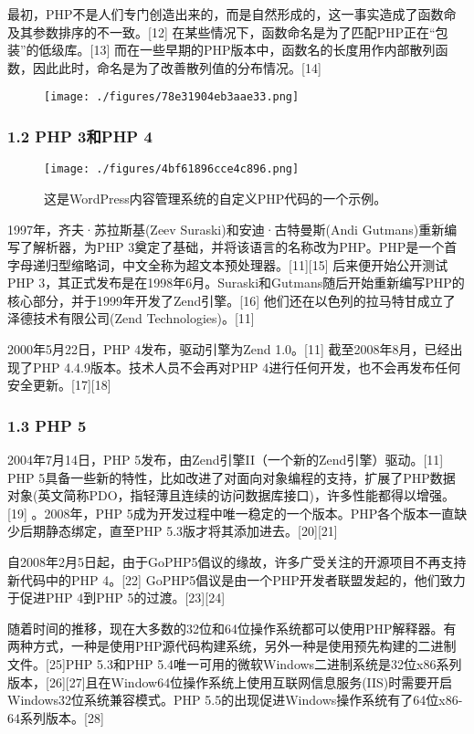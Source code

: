 最初，PHP不是人们专门创造出来的，而是自然形成的，这一事实造成了函数命及其参数排序的不一致。[12] 在某些情况下，函数命名是为了匹配PHP正在“包装”的低级库。[13] 而在一些早期的PHP版本中，函数名的长度用作内部散列函数，因此此时，命名是为了改善散列值的分布情况。[14]
\begin{figure}[ht]
\centering
\texttt{[image: ./figures/78e31904eb3aae33.png]}
\caption\label{fig_PHP_3}
\end{figure}
\subsubsection{1.2 PHP 3和PHP 4}
\begin{figure}[ht]
\centering
\texttt{[image: ./figures/4bf61896cce4c896.png]}
\caption{这是WordPress内容管理系统的自定义PHP代码的一个示例。} \label{fig_PHP_4}
\end{figure}
1997年，齐夫·苏拉斯基(Zeev Suraski)和安迪·古特曼斯(Andi Gutmans)重新编写了解析器，为PHP 3奠定了基础，并将该语言的名称改为PHP。PHP是一个首字母递归型缩略词，中文全称为超文本预处理器。[11][15] 后来便开始公开测试PHP 3，其正式发布是在1998年6月。Suraski和Gutmans随后开始重新编写PHP的核心部分，并于1999年开发了Zend引擎。[16] 他们还在以色列的拉马特甘成立了泽德技术有限公司(Zend Technologies)。[11]

2000年5月22日，PHP 4发布，驱动引擎为Zend 1.0。[11] 截至2008年8月，已经出现了PHP 4.4.9版本。技术人员不会再对PHP 4进行任何开发，也不会再发布任何安全更新。[17][18]
\subsubsection{1.3 PHP 5}
2004年7月14日，PHP 5发布，由Zend引擎II（一个新的Zend引擎）驱动。[11] PHP 5具备一些新的特性，比如改进了对面向对象编程的支持，扩展了PHP数据对象(英文简称PDO，指轻薄且连续的访问数据库接口)，许多性能都得以增强。[19] 。2008年，PHP 5成为开发过程中唯一稳定的一个版本。PHP各个版本一直缺少后期静态绑定，直至PHP 5.3版才将其添加进去。[20][21]

自2008年2月5日起，由于GoPHP5倡议的缘故，许多广受关注的开源项目不再支持新代码中的PHP 4。[22] GoPHP5倡议是由一个PHP开发者联盟发起的，他们致力于促进PHP 4到PHP 5的过渡。[23][24]

随着时间的推移，现在大多数的32位和64位操作系统都可以使用PHP解释器。有两种方式，一种是使用PHP源代码构建系统，另外一种是使用预先构建的二进制文件。[25]PHP 5.3和PHP 5.4唯一可用的微软Windows二进制系统是32位x86系列版本，[26][27]且在Window64位操作系统上使用互联网信息服务(IIS)时需要开启Windows32位系统兼容模式。PHP 5.5的出现促进Windows操作系统有了64位x86-64系列版本。[28]

